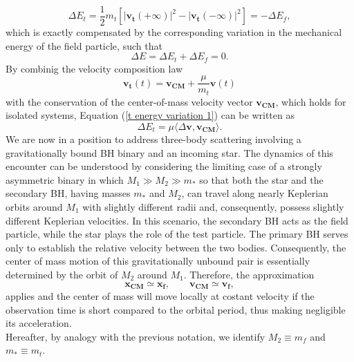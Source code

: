 \documentclass[12pt,twoside,openany]{book}
\begin{document}
\begin{equation}\label{t energy variation 1}
\Delta E_t=\frac{1}{2}m_t[|\mathbf{v_t}(+\infty)|^2-  |\mathbf{v_t}(-\infty)|^2]=-\Delta E_f,
\end{equation}
which is exactly compensated by the corresponding variation in the mechanical energy of the field particle, such that
\begin{equation}
\Delta E= \Delta E_t+\Delta E_f=0.
\end{equation}
By combinig the velocity composition law
\begin{equation}
    \mathbf{v_t}(t)=\mathbf{v_{CM}}+\frac{\mu}{m_t}\mathbf{v}(t)
\end{equation}
with the conservation of the center-of-mass velocity vector $\mathbf{v_{CM}}$, which holds for isolated systems, Equation (\ref{t energy variation 1}) can be written as \parencite{Ciotti_book}
\begin{equation}
    \Delta E_t=\mu\langle \Delta\mathbf{v}, \mathbf{v_{CM}} \rangle.
\end{equation}
We are now in a position to address three-body scattering involving a gravitationally bound BH binary and an incoming star. The dynamics of this encounter can be understood by considering the limiting case of a strongly asymmetric binary in which $M_1\gg M_2\gg m_*$ so that both the star and the secondary BH, having masses $m_*$ and $M_2$, can travel along nearly Keplerian orbits around $M_1$ with slightly different radii and, consequently, possess slightly different Keplerian velocities. In this scenario, the secondary BH acts as the field particle, while the star plays the role of the test particle. The primary BH serves only to establish the relative velocity between the two bodies. Consequently, the center of mass motion of this gravitationally unbound pair is essentially determined by the orbit of $M_2$ around $M_1$. Therefore, the approximation
\begin{equation}\label{Primary BH approx CM}
    \mathbf{x_{CM}}\simeq \mathbf{x_f}, \qquad\mathbf{v_{CM}}\simeq \mathbf{v_f},
\end{equation}
applies and the center of mass will move locally at costant velocity if the observation time is short compared to the orbital period, thus making negligible its acceleration.\\Hereafter, by analogy with the previous notation, we identify $M_2\equiv m_f$ and $m_*\equiv m_t$.
\end{document}
